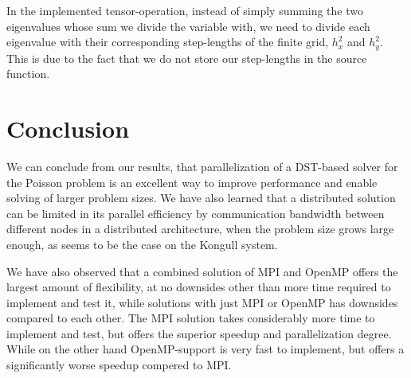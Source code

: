 \documentclass[fontsize=11pt,paper=a4,titlepage]{article}
\begin{document}
In the implemented tensor-operation, instead of simply summing the two
eigenvalues whose sum we divide the variable with, we need to divide each
eigenvalue with their corresponding step-lengths of the finite grid, $h_x^2$ and
$h_y^2$. This is due to the fact that we do not store our step-lengths in the
source function.

\section{Conclusion}

We can conclude from our results, that parallelization of a DST-based solver for
the Poisson problem is an excellent way to improve performance and enable
solving of larger problem sizes. We have also learned that a distributed
solution can be limited in its parallel efficiency by communication bandwidth
between different nodes in a distributed architecture, when the problem size
grows large enough, as seems to be the case on the Kongull system.

We have also observed that a combined solution of MPI and OpenMP offers the
largest amount of flexibility, at no downsides other than more time required to
implement and test it, while solutions with just MPI or OpenMP has downsides
compared to each other. The MPI solution takes considerably more time to
implement and test, but offers the superior speedup and parallelization degree.
While on the other hand OpenMP-support is very fast to implement, but offers a
significantly worse speedup compered to MPI.




{}

\end{document}
